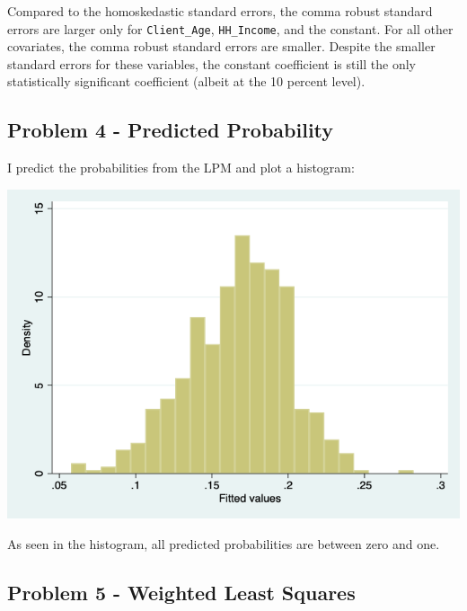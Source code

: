 \documentclass{article}
\begin{document}
\bigskip

\begin{center}

\end{center}

\bigskip

Compared to the homoskedastic standard errors, the comma robust standard errors are larger only for \texttt{Client\_Age}, \texttt{HH\_Income}, and the constant.  For all other covariates, the comma robust standard errors are smaller. Despite the smaller standard errors for these variables, the constant coefficient is still the only statistically significant coefficient (albeit at the 10 percent level).

\pagebreak

\subsection*{Problem 4 - Predicted Probability}

I predict the probabilities from the LPM and plot a histogram:

\bigskip

\begin{center}
\includegraphics[scale =0.5]{p4_figure}
\end{center}

\bigskip

As seen in the histogram, all predicted probabilities are between zero and one.

\pagebreak

\subsection*{Problem 5 - Weighted Least Squares}
\end{document}

